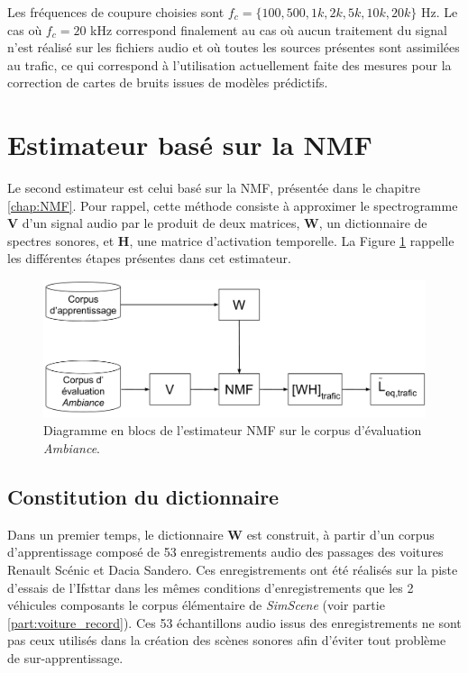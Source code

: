 Les fréquences de coupure choisies sont $f_c = \lbrace 100, 500, 1k, 2k, 5k, 10k, 20k \rbrace$ Hz. Le cas où $f_c = 20$ kHz correspond finalement au cas où aucun traitement du signal n'est réalisé sur les fichiers audio et où toutes les sources présentes sont assimilées au trafic, ce qui correspond à l'utilisation actuellement faite des mesures pour la correction de cartes de bruits issues de modèles prédictifs.


\section{Estimateur basé sur la NMF}
Le second estimateur est celui basé sur la NMF, présentée dans le chapitre \ref{chap:NMF}. Pour rappel, cette méthode consiste à approximer le spectrogramme $\mathbf{V}$ d'un signal audio par le produit de deux matrices, $\mathbf{W}$, un dictionnaire de spectres sonores, et $\mathbf{H}$, une matrice d'activation temporelle. La Figure \ref{fig:nmf_ambiance} rappelle les différentes étapes présentes dans cet estimateur.

\begin{figure}[ht]
\centering
\includegraphics[width=0.7\linewidth]{./figures/NMF/NMF_ambiance.pdf}
\caption{Diagramme en blocs de l'estimateur NMF sur le corpus d'évaluation \textit{Ambiance}.}
\label{fig:nmf_ambiance}
\end{figure}


\subsection{Constitution du dictionnaire} 

Dans un premier temps, le dictionnaire $\mathbf{W}$ est construit, à partir d'un corpus d'apprentissage composé de 53  enregistrements audio des passages des voitures Renault Scénic et Dacia Sandero. Ces enregistrements ont été réalisés sur la piste d'essais de l'Ifsttar dans les mêmes conditions d'enregistrements que les 2 véhicules composants le corpus élémentaire de \textit{SimScene} (voir partie \ref{part:voiture_record}). Ces 53 échantillons audio issus des enregistrements ne sont pas ceux utilisés dans la création des scènes sonores afin d'éviter tout problème de sur-apprentissage.

